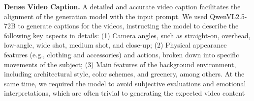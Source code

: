 \textbf{Dense Video Caption.} A detailed and accurate video caption facilitates the alignment of the generation model with the input prompt. We used QwenVL2.5-72B \cite{Qwen2.5-VL} to generate captions for the videos, instructing the model to describe the following key aspects in details: (1) Camera angles, such as straight-on, overhead, low-angle, wide shot, medium shot, and close-up; (2) Physical appearance features (e.g., clothing and accessories) and actions, broken down into specific movements of the subject; (3) Main features of the background environment, including architectural style, color schemes, and greenery, among others.
At the same time, we required the model to avoid subjective evaluations and emotional interpretations, which are often trivial to generating the expected video content
 
 




